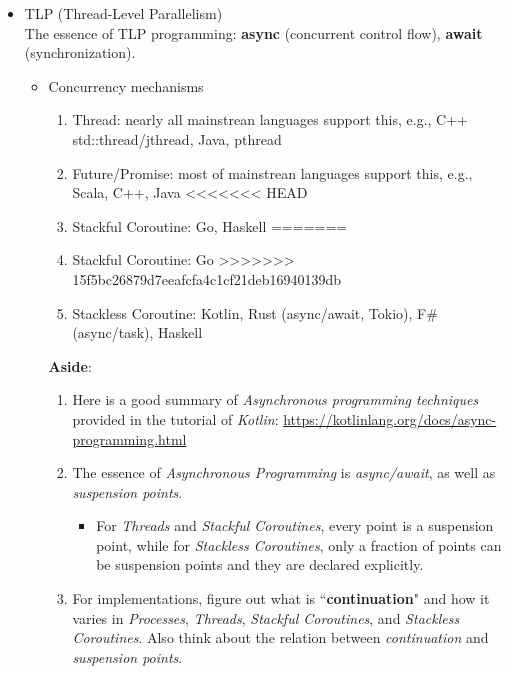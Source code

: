 \documentclass{article}
\begin{document}
\begin{itemize}
    \item TLP (Thread-Level Parallelism)\\
    The essence of TLP programming: \textbf{async} (concurrent control flow), \textbf{await} (synchronization).
    \begin{itemize}
        \item Concurrency mechanisms
        \begin{enumerate}
            \item Thread: nearly all mainstrean languages support this, e.g., C++ std::thread/jthread, Java, pthread
            \item Future/Promise: most of mainstrean languages support this,  e.g., Scala, C++, Java
<<<<<<< HEAD
            \item Stackful Coroutine: Go, Haskell
=======
            \item Stackful Coroutine: Go
>>>>>>> 15f5bc26879d7eeafcfa4c1cf21deb16940139db
            \item Stackless Coroutine: Kotlin, Rust (async/await, Tokio), F\# (async/task), Haskell
        \end{enumerate}
        \textbf{Aside}:
        \begin{enumerate}
                \item Here is a good summary of \emph{Asynchronous programming techniques} provided in the tutorial of \emph{Kotlin}:
            \href{https://kotlinlang.org/docs/async-programming.html}{https://kotlinlang.org/docs/async-programming.html}
            \item The essence of \emph{Asynchronous Programming} is \emph{async/await}, as well as \emph{suspension points}.
            \begin{itemize}
                \item For \emph{Threads} and \emph{Stackful Coroutines}, every point is a suspension point, while for \emph{Stackless Coroutines}, only a fraction of points can be suspension points and they are declared explicitly.
            \end{itemize}
            \item For implementations, figure out what is ``\textbf{continuation}" and how it varies in \emph{Processes}, \emph{Threads}, \emph{Stackful Coroutines}, and \emph{Stackless Coroutines}.
            Also think about the relation between \emph{continuation} and \emph{suspension points}.
        \end{enumerate}


\end{itemize}
\end{itemize}
\end{document}
